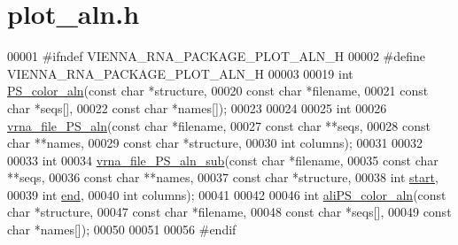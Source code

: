 \hypertarget{plot__aln_8h_source}{}\section{plot\+\_\+aln.\+h}
\label{plot__aln_8h_source}

\begin{DoxyCode}
00001 \textcolor{preprocessor}{#ifndef VIENNA\_RNA\_PACKAGE\_PLOT\_ALN\_H}
00002 \textcolor{preprocessor}{#define VIENNA\_RNA\_PACKAGE\_PLOT\_ALN\_H}
00003 
00019 \textcolor{keywordtype}{int} \mbox{\hyperlink{group__plotting__utils_ga821802c3685e37e15182341f6217470d}{PS\_color\_aln}}(\textcolor{keyword}{const} \textcolor{keywordtype}{char} *structure,
00020                  \textcolor{keyword}{const} \textcolor{keywordtype}{char} *filename,
00021                  \textcolor{keyword}{const} \textcolor{keywordtype}{char} *seqs[],
00022                  \textcolor{keyword}{const} \textcolor{keywordtype}{char} *names[]);
00023 
00024 
00025 \textcolor{keywordtype}{int}
00026 \mbox{\hyperlink{group__plotting__utils_ga76b5c0637db9385a553cdd8e66e61eca}{vrna\_file\_PS\_aln}}(\textcolor{keyword}{const} \textcolor{keywordtype}{char} *filename,
00027                  \textcolor{keyword}{const} \textcolor{keywordtype}{char} **seqs,
00028                  \textcolor{keyword}{const} \textcolor{keywordtype}{char} **names,
00029                  \textcolor{keyword}{const} \textcolor{keywordtype}{char} *structure,
00030                  \textcolor{keywordtype}{int}        columns);
00031 
00032 
00033 \textcolor{keywordtype}{int}
00034 \mbox{\hyperlink{group__plotting__utils_ga2881c9b855baff948f92b93262df9ff6}{vrna\_file\_PS\_aln\_sub}}(\textcolor{keyword}{const} \textcolor{keywordtype}{char} *filename,
00035                      \textcolor{keyword}{const} \textcolor{keywordtype}{char} **seqs,
00036                      \textcolor{keyword}{const} \textcolor{keywordtype}{char} **names,
00037                      \textcolor{keyword}{const} \textcolor{keywordtype}{char} *structure,
00038                      \textcolor{keywordtype}{int}        \mbox{\hyperlink{special__const_8h_ab53016e6941484f46238d59e2549decb}{start}},
00039                      \textcolor{keywordtype}{int}        \mbox{\hyperlink{special__const_8h_acc28e141c890270905160748bebdc3ed}{end}},
00040                      \textcolor{keywordtype}{int}        columns);
00041 
00042 
00046 \textcolor{keywordtype}{int} \mbox{\hyperlink{group__plotting__utils_gaab48d4dac655d688abe921389ac2847c}{aliPS\_color\_aln}}(\textcolor{keyword}{const} \textcolor{keywordtype}{char}  *structure,
00047                     \textcolor{keyword}{const} \textcolor{keywordtype}{char}  *filename,
00048                     \textcolor{keyword}{const} \textcolor{keywordtype}{char}  *seqs[],
00049                     \textcolor{keyword}{const} \textcolor{keywordtype}{char}  *names[]);
00050 
00051 
00056 \textcolor{preprocessor}{#endif}
\end{DoxyCode}
